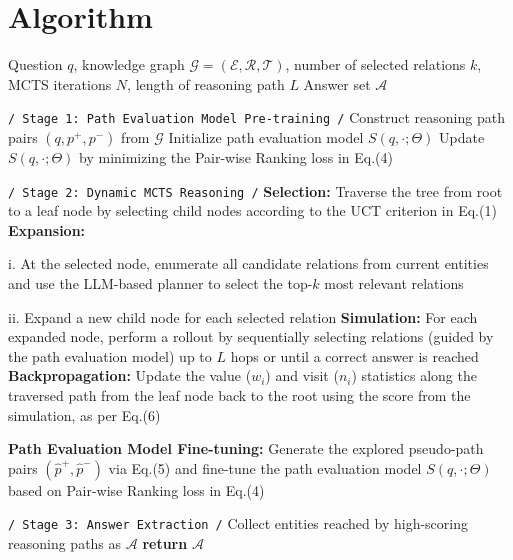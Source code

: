 \clearpage
\onecolumn
\appendix

\section{Algorithm}\label{sec:algorithm}

\begin{algorithm}[h]
    \caption{Dynamic MCTS-based KGQA with Path Model Pretraining and Online Refinement}
    \renewcommand{\algorithmicrequire}{\textbf{Input:}}
    \renewcommand{\algorithmicensure}{\textbf{Output:}}
    \begin{algorithmic}[1]
        \REQUIRE Question $q$, knowledge graph $\mathcal{G} = (\mathcal{E}, \mathcal{R}, \mathcal{T})$, number of selected relations $k$, MCTS iterations $N$, length of reasoning path $L$
        \ENSURE Answer set $\mathcal{A}$
        
        \STATE \texttt{/ Stage 1: Path Evaluation Model Pre-training /}
        \STATE Construct reasoning path pairs $(q, p^{+}, p^{-})$ from $\mathcal{G}$ 
        \STATE Initialize path evaluation model $S(q, \cdot; \Theta)$
            \STATE Update $S(q, \cdot; \Theta)$ by minimizing the Pair-wise Ranking loss in Eq.(4) 
        \ENDFOR

        \STATE \texttt{/ Stage 2: Dynamic MCTS Reasoning /}
            \STATE \textbf{Selection:}
            Traverse the tree from root to a leaf node by selecting child nodes according to the UCT criterion in Eq.(1)
            \STATE \textbf{Expansion:}
            
            \STATE i. At the selected node, enumerate all candidate relations from current entities and use the LLM-based planner to select the top-$k$ most relevant relations
            
            \STATE ii. Expand a new child node for each selected relation
            \STATE \textbf{Simulation:}
            For each expanded node, perform a rollout by sequentially selecting relations (guided by the path evaluation model) up to $L$ hops or until a correct answer is reached
            \STATE \textbf{Backpropagation:}
            Update the value ($w_i$) and visit ($n_i$) statistics along the traversed path from the leaf node back to the root using the score from the simulation, as per Eq.(6)
            
            \STATE \textbf{Path Evaluation Model Fine-tuning:} Generate the explored pseudo-path pairs $(\hat{p}^{+}, \hat{p}^{-})$ via Eq.(5) and fine-tune  the path evaluation model $S(q, \cdot; \Theta)$ based on Pair-wise Ranking loss in Eq.(4)
        \ENDFOR

        \STATE \texttt{/ Stage 3: Answer Extraction /}
        \STATE Collect entities reached by high-scoring reasoning paths as $\mathcal{A}$
        \STATE \textbf{return} $\mathcal{A}$
    \end{algorithmic}
    \label{algo:dynamic-mcts-final}
\end{algorithm}

